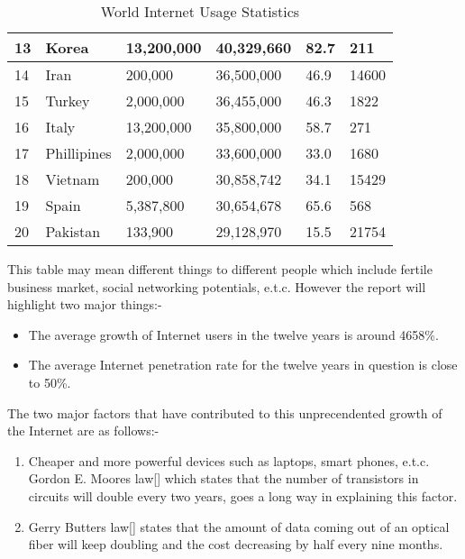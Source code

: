 \documentclass[iwp,first]{luthesis}
\begin{document}
\begin{table}
\begin{tabular}{ | l | l | l | l | l | l | }
13 &   Korea       &  13,200,000         &  40,329,660     &     82.7              &     211        \\ \hline
14 &   Iran          &    200,000            &  36,500,000     &     46.9              &   14600      \\ \hline
15 &  Turkey      &    2,000,000         &  36,455,000     &     46.3              &   1822        \\ \hline
16 &   Italy         &   13,200,000        &  35,800,000     &     58.7              &    271        \\  \hline
17 & Phillipines  & 2,000,000            &  33,600,000     &     33.0              &   1680       \\  \hline
18 & Vietnam     &   200,000             &  30,858,742     &     34.1              &   15429     \\  \hline 
19 &   Spain       &  5,387,800           &  30,654,678     &     65.6              &    568        \\  \hline
20 & Pakistan     &    133,900           &  29,128,970      &     15.5              &    21754    \\  \hline   

  \end{tabular}
\caption{World Internet Usage Statistics}
\end{table}

This table may mean different things to different people which include fertile business market, social networking potentials, e.t.c. However the report will highlight two major things:-

\begin{itemize}

\item The average growth of Internet users in the twelve years is around 4658\%. 

\item The average Internet penetration rate for the twelve years in question is close to 50\%.

\end{itemize}

The two major factors that have contributed to this unprecendented growth of the Internet are as follows:-

\begin{enumerate}

\item Cheaper and more powerful devices such as laptops, smart phones, e.t.c. Gordon E. Moores law[] which states that the number of transistors in circuits will double every two years, goes a long way in explaining this factor. 

\item Gerry Butters law[] states that the amount of data coming out of an optical fiber will keep doubling and the cost decreasing by half every nine months. 

\end{enumerate}
\end{document}
